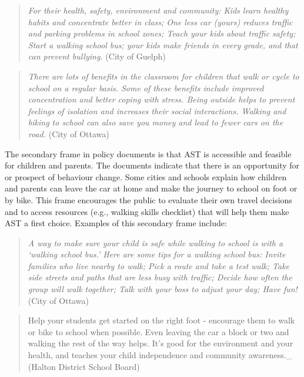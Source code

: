 \documentclass[]{elsarticle} %
\begin{document}
\begin{quote}
\emph{For their health, safety, environment and community: Kids learn
healthy habits and concentrate better in class; One less car (yours)
reduces traffic and parking problems in school zones; Teach your kids
about traffic safety; Start a walking school bus; your kids make friends
in every grade, and that can prevent bullying.} (City of Guelph)
\end{quote}

\begin{quote}
\emph{There are lots of benefits in the classroom for children that walk
or cycle to school on a regular basis. Some of these benefits include
improved concentration and better coping with stress. Being outside
helps to prevent feelings of isolation and increases their social
interactions. Walking and biking to school can also save you money and
lead to fewer cars on the road.} (City of Ottawa)
\end{quote}

The secondary frame in policy documents is that AST is accessible and
feasible for children and parents. The documents indicate that there is
an opportunity for or prospect of behaviour change. Some cities and
schools explain how children and parents can leave the car at home and
make the journey to school on foot or by bike. This frame encourages the
public to evaluate their own travel decisions and to access resources
(e.g., walking skills checklist) that will help them make AST a first
choice. Examples of this secondary frame include:

\begin{quote}
\emph{A way to make sure your child is safe while walking to school is
with a `walking school bus.' Here are some tips for a walking school
bus: Invite families who live nearby to walk; Pick a route and take a
test walk; Take side streets and paths that are less busy with traffic;
Decide how often the group will walk together; Talk with your boss to
adjust your day; Have fun!} (City of Ottawa)
\end{quote}

\begin{quote}
Help your students get started on the right foot - encourage them to
walk or bike to school when possible. Even leaving the car a block or
two and walking the rest of the way helps. It's good for the environment
and your health, and teaches your child independence and community
awareness.\_ (Halton District School Board)
\end{quote}
\end{document}
